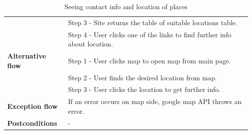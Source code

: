 \begin{center}
\begin{table}[H]
\begin{tabular}{| m{3cm}| m{10cm} |}
                                      & Step 3 - Site returns the table of suitable locations table.                                                                                                   \\
                                      & Step 4 - User clicks one of the links to find further info about location.                                                                                     \\
            \hline
            \textbf{Alternative flow} & Step 1 - User clicks map to open map from main page.                                                                                                           \\
                                      & Step 2 - User finds the desired location from map.                                                                                                             \\
                                      & Step 3 - User clicks the location to get further info.                                                                                                         \\
            \hline
            \textbf{Exception flow}   & If an error occurs on map side, google map API throws an error.                                                                                                \\
            \hline
            \textbf{Postconditions}   & -                                                                                                                                                              \\
            \hline
        \end{tabular}
        \caption[Contact info and location]{Seeing contact info and location of places}
    \end{table}

    ~\\~\\~\\


\end{center}
